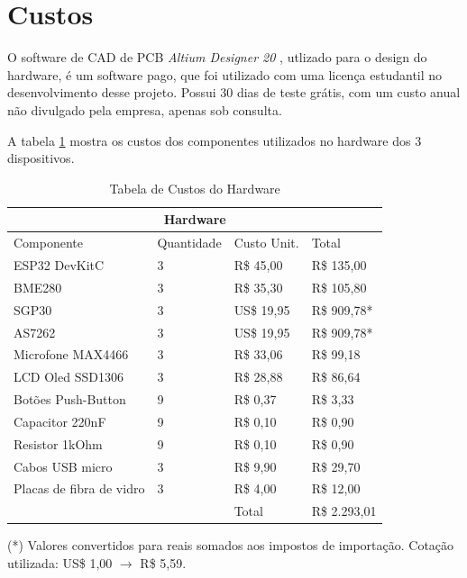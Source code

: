 \documentclass[../monografia.tex]{subfiles}
\begin{document}
\section{Custos}

O software de CAD de PCB \textit{Altium Designer 20} \cite{altium}, utlizado para o design do hardware, é um software pago, que foi utilizado com uma licença estudantil no desenvolvimento desse projeto. Possui 30 dias de teste grátis, com um custo anual não divulgado pela empresa, apenas sob consulta. 

A tabela \ref{table:custos} mostra os custos dos componentes utilizados no hardware dos 3 dispositivos. 

\begin{table}[h]
\centering
\begin{tabular}{ |p{4.5cm}|p{2cm}|p{3cm}|p{3cm}|  }
	\hline
	\multicolumn{4}{|c|}{Hardware} \\
	\hline
	\hline
	Componente & Quantidade & Custo Unit. & Total\\
	\hline
	ESP32 DevKitC 				& 3 & R\$ 45,00   & R\$ 135,00 \\
	BME280 						& 3 & R\$ 35,30   & R\$ 105,80 \\
	SGP30 						& 3 & US\$ 19,95  & R\$ 909,78* \\
	AS7262 						& 3 & US\$ 19,95  & R\$ 909,78* \\
	Microfone MAX4466 			& 3 & R\$ 33,06   & R\$ 99,18 \\
	LCD Oled SSD1306 			& 3 & R\$ 28,88   & R\$ 86,64 \\
	Botões Push-Button 			& 9 & R\$ 0,37    & R\$ 3,33 \\
	Capacitor 220nF 			& 9 & R\$ 0,10    & R\$ 0,90 \\
	Resistor 1kOhm 				& 9 & R\$ 0,10    & R\$ 0,90 \\
	Cabos USB micro 			& 3 & R\$ 9,90    & R\$ 29,70 \\
	Placas de fibra de vidro 	& 3 & R\$ 4,00    & R\$ 12,00 \\
	\hline
	\multicolumn{2}{|c|}{ } & Total & R\$ 2.293,01 \\
	\hline
\end{tabular}
	\caption{Tabela de Custos do Hardware}
	\label{table:custos}

\begin{flushleft}
	(*) Valores convertidos para reais somados aos impostos de importação. Cotação utilizada: US\$ 1,00 $\rightarrow$ R\$ 5,59.
\end{flushleft}
\end{table}
\end{document}
